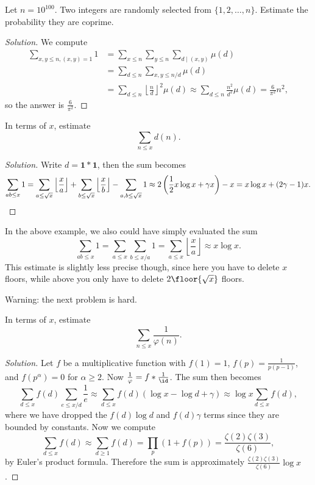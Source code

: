 \documentclass[11pt]{scrartcl}
\renewenvironment{solution}{\renewcommand\qedsymbol{$\blacksquare$}\begin{proof}[Solution]}{\end{proof}}
\begin{document}
\begin{example}
	Let $n = 10^{100}$. Two integers are randomly selected from $\{1,2,\dots,n\}$. Estimate the probability they are coprime.
\end{example}

\begin{solution}
	We compute
	\begin{align*}
		\sum_{x,y \le n,(x,y) = 1}1 &= \sum_{x \le n}\sum_{y \le n}\sum_{d \mid (x,y)}\mu(d) \\
		&= \sum_{d \le n}\sum_{x,y \le n/d}\mu(d) \\
		&= \sum_{d \le n}\left\lfloor \frac nd\right\rfloor^2\mu(d) \approx \sum_{d \le n}\frac{n^2}{d^2}\mu(d) = \frac{6}{\pi^2}n^2,
	\end{align*}
	so the answer is $\frac 6{\pi^2}$.
\end{solution}

\begin{example}
	In terms of $x$, estimate
	\[\sum_{n \le x}d(n).\]
\end{example}

\begin{solution}
	Write $d = \mathbf1 \ast \mathbf1$, then the sum becomes
	\[
		\sum_{ab \le x}1
		= \sum_{a \le \sqrt x}\left\lfloor \frac xa\right\rfloor + \sum_{b \le \sqrt x}\left\lfloor \frac xb\right\rfloor - \sum_{a,b \le \sqrt x}1
		\approx 2\left(\frac12 x \log x + \gamma x\right) - x
		= x \log x + (2\gamma - 1)x. \qedhere
	\]
\end{solution}

In the above example, we also could have simply evaluated the sum
\[\sum_{ab \le x}1 = \sum_{a \le x}\sum_{b \le x/a}1 = \sum_{a \le x}\left\lfloor \frac xa\right\rfloor \approx x \log x.\]
This estimate is slightly less precise though, since here you have to delete $x$ floors, while above you only have to delete $2\floor{\sqrt x}$ floors.

Warning: the next problem is hard.

\begin{example}
	In terms of $x$, estimate
	\[\sum_{n \le x}\frac1{\varphi(n)}.\]
\end{example}

\begin{solution}
	Let $f$ be a multiplicative function with $f(1) = 1$, $f(p) = \frac{1}{p(p - 1)}$, and $f(p^\alpha) = 0$ for $\alpha \ge 2$. Now $\frac{1}{\varphi} = f \ast \frac1{\id}$. The sum then becomes
	\[\sum_{d \le x}f(d)\sum_{e \le x/d}\frac1e \approx \sum_{d \le x}f(d)(\log x - \log d + \gamma) \approx \log x\sum_{d \le x}f(d),\]
	where we have dropped the $f(d)\log d$ and $f(d)\gamma$ terms since they are bounded by constants. Now we compute
	\[\sum_{d \le x}f(d) \approx \sum_{d \ge 1}f(d) = \prod_p(1 + f(p)) = \frac{\zeta(2)\zeta(3)}{\zeta(6)},\]
	by Euler's product formula. Therefore the sum is approximately $\frac{\zeta(2)\zeta(3)}{\zeta(6)}\log x$.
\end{solution}
\end{document}
